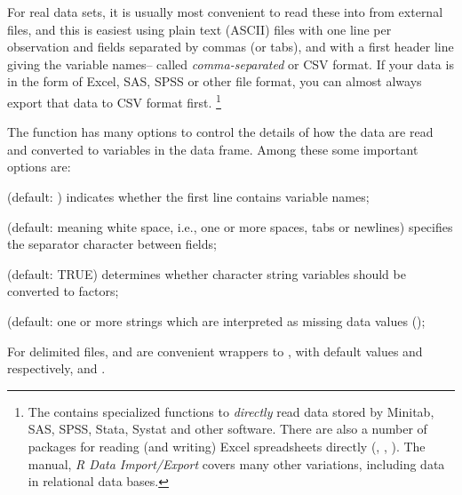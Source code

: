 \documentclass[11pt]{book}\usepackage[]{graphicx}\usepackage[]{color}
\begin{document}
For real data sets, it is usually most convenient to read these into \R
from external files, and this is easiest using plain text (ASCII) files
with one line per observation and fields separated by commas (or tabs),
and with a first header line giving the variable names-- called
\emph{comma-separated} or CSV format.
If your data is in the form of Excel, SAS, SPSS or other file format,
you can almost always export that data to CSV format first.%
\footnote{
The  contains specialized functions to \emph{directly} read
data stored by Minitab, SAS, SPSS, Stata, Systat and other software.
There are also a number of packages for reading (and writing)
Excel spreadsheets directly (, , ).
The \R manual, \emph{R Data Import/Export} covers many other variations,
including data in relational data bases.
}

The function  has many options to control the details
of how the data are read and converted to variables in the data frame.
Among these some important options are:
\begin{description*}
  \item [\code{header}] (default: ) indicates whether the first line contains
variable names;
  \item[\code{sep}] (default:  meaning white space, i.e., one or more spaces, tabs or newlines) specifies the separator character between fields;
  \item[\code{stringsAsFactors}] (default: TRUE) determines whether character string variables should be converted to factors;
  \item[\code{na.strings}] (default:  one or more strings which are interpreted
  as missing data values ();
\end{description*}
For delimited files,  and  are convenient wrappers
to , with default values  and 
respectively, and
. 
\end{document}
